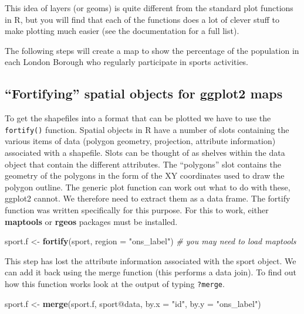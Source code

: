 \documentclass[]{article}
\newenvironment{Shaded}{}{}
\newcommand{\KeywordTok}[1]{\textcolor[rgb]{0.00,0.44,0.13}{\textbf{{#1}}}}
\newcommand{\DataTypeTok}[1]{\textcolor[rgb]{0.56,0.13,0.00}{{#1}}}
\newcommand{\StringTok}[1]{\textcolor[rgb]{0.25,0.44,0.63}{{#1}}}
\newcommand{\CommentTok}[1]{\textcolor[rgb]{0.38,0.63,0.69}{\textit{{#1}}}}
\newcommand{\NormalTok}[1]{{#1}}
\begin{document}
This idea of layers (or geoms) is quite different from the standard plot
functions in R, but you will find that each of the functions does a lot
of clever stuff to make plotting much easier (see the documentation for
a full list).

The following steps will create a map to show the percentage of the
population in each London Borough who regularly participate in sports
activities.

\subsection{``Fortifying'' spatial objects for ggplot2
maps}\label{fortifying-spatial-objects-for-ggplot2-maps}

To get the shapefiles into a format that can be plotted we have to use
the \texttt{fortify()} function. Spatial objects in R have a number of
slots containing the various items of data (polygon geometry,
projection, attribute information) associated with a shapefile. Slots
can be thought of as shelves within the data object that contain the
different attributes. The ``polygons'' slot contains the geometry of the
polygons in the form of the XY coordinates used to draw the polygon
outline. The generic plot function can work out what to do with these,
ggplot2 cannot. We therefore need to extract them as a data frame. The
fortify function was written specifically for this purpose. For this to
work, either \textbf{maptools} or \textbf{rgeos} packages must be
installed.

\begin{Shaded}
\begin{Highlighting}[]
\NormalTok{sport.f <-}\StringTok{ }\KeywordTok{fortify}\NormalTok{(sport, }\DataTypeTok{region =} \StringTok{"ons_label"}\NormalTok{)  }\CommentTok{# you may need to load maptools}
\end{Highlighting}
\end{Shaded}

This step has lost the attribute information associated with the sport
object. We can add it back using the merge function (this performs a
data join). To find out how this function works look at the output of
typing \texttt{?merge}.

\begin{Shaded}
\begin{Highlighting}[]
\NormalTok{sport.f <-}\StringTok{ }\KeywordTok{merge}\NormalTok{(sport.f, sport@data, }\DataTypeTok{by.x =} \StringTok{"id"}\NormalTok{, }\DataTypeTok{by.y =} \StringTok{"ons_label"}\NormalTok{)}
\end{Highlighting}
\end{Shaded}
\end{document}
